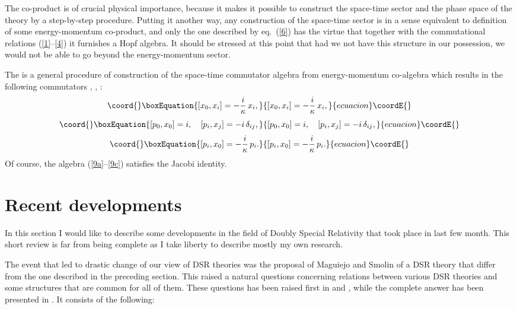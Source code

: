 \documentclass[a4paper,a4paper]{article}
\begin{document}
The co-product is of crucial physical importance, because it makes it possible to construct the space-time sector and the phase space of the theory by a step-by-step procedure.  Putting it another way, any construction of the space-time sector is in a sense equivalent to definition of some energy-momentum co-product, and only the one described by eq.~(\ref{6}) has the virtue that together with the commutational relations (\ref{1}--\ref{4}) it furnishes a Hopf algebra. It should be stressed at this point that had we not have this structure in our possession, we would not be able to go beyond the energy-momentum sector.

The is a general procedure of construction of the space-time
commutator algebra from energy-momentum  co-algebra
which results in the following commutators \cite{maru}, \cite{crossalg}, \cite{juse}:
\begin{equation}\coord{}\boxEquation{\label{9a}
[x_0, x_i] = -\frac{i}\kappa\, x_i,
}{[x_0, x_i] = -\frac{i}\kappa\, x_i,
}{ecuacion}\coordE{}\end{equation}
\begin{equation}\coord{}\boxEquation{\label{9b}
[p_0, x_0] = i, \quad [p_i, x_j] = -i \, \delta_{ij},
}{[p_0, x_0] = i, \quad [p_i, x_j] = -i \, \delta_{ij},
}{ecuacion}\coordE{}\end{equation}
\begin{equation}\coord{}\boxEquation{\label{9c}
 [p_i, x_0] = -\frac{i}\kappa\, p_i.
}{[p_i, x_0] = -\frac{i}\kappa\, p_i.
}{ecuacion}\coordE{}\end{equation}
Of course, the algebra (\ref{9a}--\ref{9c}) satisfies the Jacobi identity.

\section{Recent developments}

In this section I would like to describe some developments in the field of Doubly Special Relativity that took place in last few month. This short review is far from being complete as I take liberty to describe mostly my own research.

The event that led to drastic change of our view of DSR theories was the proposal of Maguiejo and Smolin \cite{Magueijo:2002am} of a DSR theory that differ from the one described in the preceding section. This raised a natural questions concerning relations between various DSR theories and some structures that are common for all of them. These questions has been raised first in \cite{juse} and \cite{lunoDSR}, while the complete answer has been presented in \cite{Kowalski-Glikman:2002jr}. It consists of the following:
\end{document}
